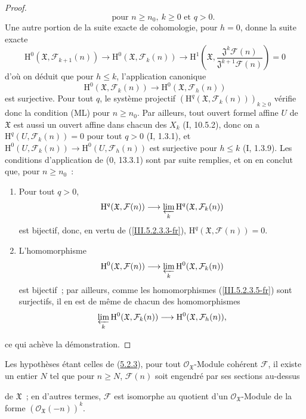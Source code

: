 \begin{proof}
\begin{equation}
\qquad\text{pour }n\geq n_0,\ k\geq0\text{ et }q>0.
\tag{5.2.3.3}
\label{III.5.2.3.3-fr}
\end{equation}
Une autre portion de la suite exacte de cohomologie, pour $h=0$, donne la suite
exacte
\begin{equation}
\mathrm H^0(\mathfrak X,\mathcal F_{k+1}(n))\to
\mathrm H^0(\mathfrak X,\mathcal F_k(n))\to
\mathrm H^1\left(\mathfrak X,
\frac{\mathfrak J^k\mathcal F(n)}{\mathfrak J^{k+1}\mathcal F(n)}\right)=0
\tag{5.2.3.4}
\label{III.5.2.3.4-fr}
\end{equation}
d'où on déduit que pour $h\leq k$, l'application canonique
\begin{equation}
\mathrm H^0(\mathfrak X,\mathcal F_k(n))\longrightarrow
\mathrm H^0(\mathfrak X,\mathcal F_h(n))
\tag{5.2.3.5}
\label{III.5.2.3.5-fr}
\end{equation}
est surjective. Pour tout $q$, le système projectif
$(\mathrm H^q(\mathfrak X,\mathcal F_k(n)))_{k\geq0}$ vérifie donc la condition
(ML) pour $n\geq n_0$. Par ailleurs, tout ouvert formel affine $U$ de $\mathfrak X$
est aussi un ouvert affine dans chacun des $X_k$ (I, 10.5.2), donc on a
$\mathrm H^q(U,\mathcal F_k(n))=0$ pour tout $q>0$ (I, 1.3.1), et
$\mathrm H^0(U,\mathcal F_k(n))\to\mathrm H^0(U,\mathcal F_h(n))$ est surjective
pour $h\leq k$ (I, 1.3.9). Les conditions d'application de ($0$, 13.3.1) sont par
suite remplies, et on en conclut que, pour $n\geq n_0$~:
\begin{enumerate}
\item[$1^\circ$] Pour tout $q>0$,
\[
\mathrm H^q(\mathfrak X,\mathcal F(n))\longrightarrow
\varprojlim_k\mathrm H^q(\mathfrak X,\mathcal F_k(n))
\]
est bijectif, donc, en vertu de (\ref{III.5.2.3.3-fr}),
$\mathrm H^q(\mathfrak X,\mathcal F(n))=0$.
\item[$2^\circ$] L'homomorphisme
\[
\mathrm H^0(\mathfrak X,\mathcal F(n))\longrightarrow
\varprojlim_k\mathrm H^0(\mathfrak X,\mathcal F_k(n))
\]
est bijectif~; par ailleurs, comme les homomorphismes
(\ref{III.5.2.3.5-fr}) sont surjectifs, il en est de même de chacun des
homomorphismes
\[
\varprojlim_k\mathrm H^0(\mathfrak X,\mathcal F_k(n))
\longrightarrow\mathrm H^0(\mathfrak X,\mathcal F_h(n)),
\]
\end{enumerate}
ce qui achève la démonstration.
\end{proof}

\begin{corollary}[5.2.4]
\label{III.5.2.4-fr}
Les hypothèses étant celles de (\hyperref[III.5.2.3-fr]{5.2.3}), pour tout
$\mathcal O_{\mathfrak X}$-Module cohérent $\mathcal F$, il existe un entier $N$
tel que pour $n\geq N$, $\mathcal F(n)$ soit engendré par ses sections au-dessus


de $\mathfrak X$~; en d'autres termes, $\mathcal F$ est isomorphe au quotient d'un
$\mathcal O_{\mathfrak X}$-Module de la forme
$(\mathcal O_{\mathfrak X}(-n))^k$.
\end{corollary}

